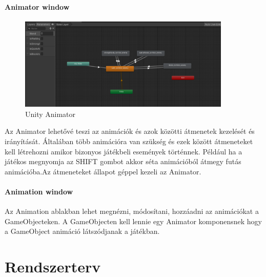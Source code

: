 \documentclass[
]{thesis-ekf}
\theoremstyle{definition}
\theoremstyle{remark}
\begin{document}
\subsubsection{Animator window}

\begin{figure}[h!]
	\centering
	\includegraphics[width=0.9\textwidth]{UnityAnimatorKep.png}
	\caption{Unity Animator}
	\label{fig:kep}
\end{figure}
Az Animator lehetővé teszi az animációk és azok közötti átmenetek kezelését és irányítását. Általában több animációra van szükség és ezek között átmeneteket kell létrehozni amikor bizonyos játékbeli események történnek. Például ha a játékos megnyomja az SHIFT gombot akkor séta animációból átmegy futás animációba.Az átmeneteket állapot géppel kezeli az Animator.

\subsubsection{Animation window}
Az Animation ablakban lehet megnézni, módosítani, hozzáadni az animációkat a GameObjecteken. A GameObjecten kell lennie egy Animator komponensnek hogy a GameObject animáció látszódjanak a játékban.

\chapter{Rendszerterv}
\end{document}
